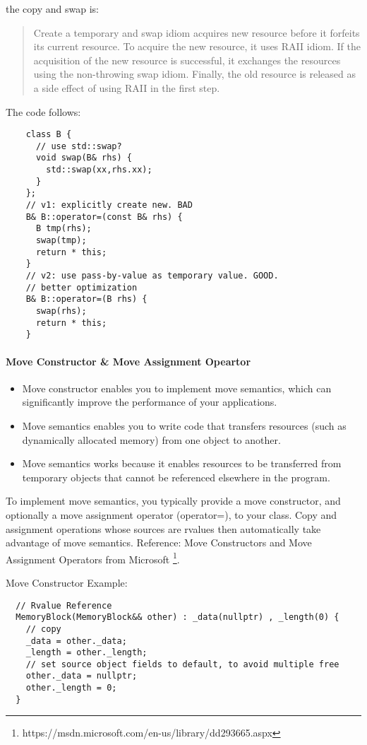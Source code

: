 the copy and swap is:
\begin{quote}
Create a temporary and swap idiom acquires new resource before it forfeits its current resource.
To acquire the new resource, it uses RAII idiom.
If the acquisition of the new resource is successful, it exchanges the resources using the non-throwing swap idiom.
Finally, the old resource is released as a side effect of using RAII in the first step.
\end{quote}

The code follows:
\begin{lstlisting}
    class B {
      // use std::swap?
      void swap(B& rhs) {
        std::swap(xx,rhs.xx);
      }
    };
    // v1: explicitly create new. BAD
    B& B::operator=(const B& rhs) {
      B tmp(rhs);
      swap(tmp);
      return * this;
    }
    // v2: use pass-by-value as temporary value. GOOD.
    // better optimization
    B& B::operator=(B rhs) {
      swap(rhs);
      return * this;
    }
\end{lstlisting}

\paragraph{Move Constructor \& Move Assignment Opeartor}
\begin{itemize}
\item Move constructor enables you to implement move semantics, which
  can significantly improve the performance of your applications.
\item Move semantics enables you to write code that transfers
  resources (such as dynamically allocated memory) from one object to
  another.
\item Move semantics works because it enables resources to be
  transferred from temporary objects that cannot be referenced
  elsewhere in the program.
\end{itemize}

To implement move semantics, you typically provide a move constructor,
and optionally a move assignment operator (operator=), to your class.
Copy and assignment operations whose sources are rvalues then
automatically take advantage of move semantics.
Reference: Move Constructors and Move Assignment Operators from
Microsoft
\footnote{https://msdn.microsoft.com/en-us/library/dd293665.aspx}.

Move Constructor Example:
\begin{lstlisting}
  // Rvalue Reference
  MemoryBlock(MemoryBlock&& other) : _data(nullptr) , _length(0) {
    // copy
    _data = other._data;
    _length = other._length;
    // set source object fields to default, to avoid multiple free
    other._data = nullptr;
    other._length = 0;
  }
\end{lstlisting}


